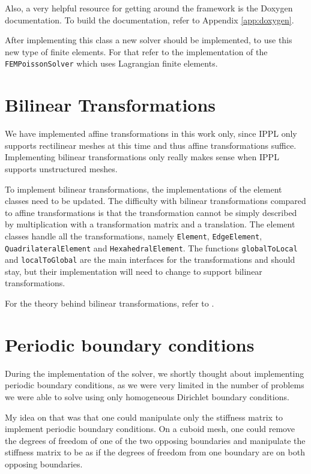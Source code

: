 Also, a very helpful resource for getting around the framework is the Doxygen documentation.
To build the documentation, refer to Appendix \ref{app:doxygen}.

After implementing this class a new solver should be implemented, to use this new type of finite elements.
For that refer to the implementation of the \texttt{FEMPoissonSolver} which uses Lagrangian finite elements.

\section{Bilinear Transformations}
\label{sec:bilinear_transformations}

We have implemented affine transformations in this work only, since IPPL only supports rectilinear meshes at this
time and thus affine transformations suffice.
Implementing bilinear transformations only really makes sense when IPPL supports unstructured meshes.

To implement bilinear transformations, the implementations of the element classes need to be updated.
The difficulty with bilinear transformations compared to affine transformations is that the transformation cannot
be simply described by multiplication with a transformation matrix and a translation.
The element classes handle all the transformations, namely \texttt{Element}, \texttt{EdgeElement}, \texttt{QuadrilateralElement}
and \texttt{HexahedralElement}. The functions \texttt{globalToLocal} and \texttt{localToGlobal} are the main interfaces for the transformations
and should stay, but their implementation will need to change to support bilinear transformations.

For the theory behind bilinear transformations, refer to \cite[Chatper~2.8.2]{hiptmair_numerical_2023}.

\section{Periodic boundary conditions}

During the implementation of the solver, we shortly thought about implementing periodic boundary
conditions, as we were very limited in the number of problems we were able to solve using only
homogeneous Dirichlet boundary conditions.

My idea on that was that one could manipulate only the stiffness matrix to implement periodic boundary conditions.
On a cuboid mesh, one could remove the degrees of freedom of one of the two opposing boundaries and manipulate the
stiffness matrix to be as if the degrees of freedom from one boundary are on both opposing boundaries.

